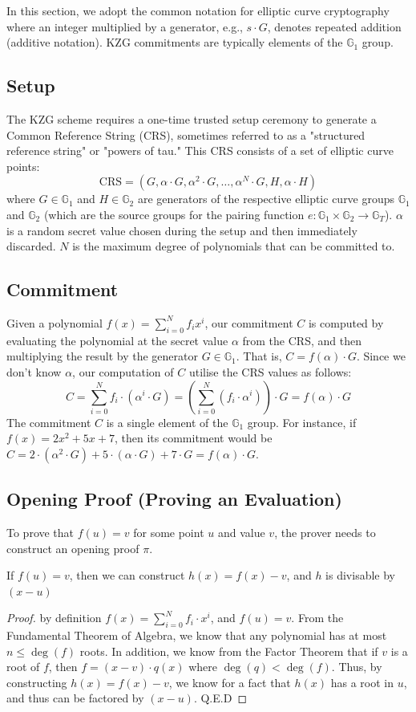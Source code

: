 In this section, we adopt the common notation for elliptic curve cryptography where an integer multiplied by a generator, e.g., $s \cdot G$, denotes repeated addition (additive notation). KZG commitments are typically elements of the $\mathbb{G}_1$ group.
\subsection{Setup}
The KZG scheme requires a one-time trusted setup ceremony to generate a Common Reference String (CRS), sometimes referred to as a "structured reference string" or "powers of tau." This CRS consists of a set of elliptic curve points:
$$ \text{CRS} = (G, \alpha\cdot G, {\alpha^2}\cdot G, \dots, {\alpha^N}\cdot G, H, \alpha \cdot H) $$
where $G \in \mathbb{G}_1$ and $H \in \mathbb{G}_2$ are generators of the respective elliptic curve groups $\mathbb{G}_1$ and $\mathbb{G}_2$ (which are the source groups for the pairing function $e: \mathbb{G}_1 \times \mathbb{G}_2 \to \mathbb{G}_T$). $\alpha$ is a random secret value chosen during the setup and then immediately discarded. $N$ is the maximum degree of polynomials that can be committed to.

\subsection{Commitment}
Given a polynomial $f(x) = \sum_{i=0}^N f_i x^i$, our commitment $C$ is computed by evaluating the polynomial at the secret value $\alpha$ from the CRS, and then multiplying the result by the generator $G \in \mathbb{G}_1$. That is, $C=f(\alpha)\cdot G$. Since we don't know $\alpha$, our computation of $C$ utilise the CRS values as follows:
$$C= \sum_{i=0}^{N}{f_i \cdot (\alpha^i\cdot G)}=(\sum_{i=0}^{N}{(f_i \cdot \alpha^i)})\cdot G= f(\alpha)\cdot G$$
The commitment $C$ is a single element of the $\mathbb{G}_1$ group.
For instance, if $f(x)=2x^2+5x+7$, then its commitment would be $C= 2 \cdot (\alpha^2\cdot G) + 5 \cdot (\alpha\cdot G) + 7 \cdot G= f(\alpha)\cdot G$.


\subsection{Opening Proof (Proving an Evaluation)}
To prove that $f(u) = v$ for some point $u$ and value $v$, the prover needs to construct an opening proof $\pi$.
\begin{lemma}
If $f(u)=v$, then we can construct $h(x)=f(x)-v$, and $h$ is divisable by $(x-u)$
\end{lemma}
\begin{proof}
    by definition $f(x)=\sum_{i=0}^{N}{f_i\cdot x^i}$, and $f(u)=v$. 
    From the Fundamental Theorem of Algebra, we know that any polynomial has at most $n\le \deg(f)$ roots. 
    In addition, we know from the Factor Theorem that if $v$ is a root of $f$, then $f=(x-v)\cdot q(x)$ where
    $\deg(q)< \deg(f)$. 
    Thus, by constructing $h(x)=f(x)-v$, we know for a fact that $h(x)$ has a root in $u$, and thus can be 
    factored by $(x-u)$. Q.E.D
\end{proof}

